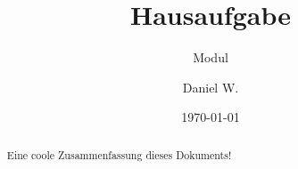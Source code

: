 \documentclass[
    a4paper,
    11pt,
    onecolumn,
    abstracton,
    notitlepage,
    parskip=half,
    egregdoesnotlikesansseriftitles
]{scrartcl} %
\title{Hausaufgabe}
\subtitle{Modul}
\author{Daniel W.}
\date{\today}
\numberwithin{equation}{section}                    %
\theoremstyle{plain} %
\theoremstyle{remark}
\begin{document}
\maketitle

\begin{abstract}
  Eine coole Zusammenfassung dieses Dokuments!
\end{abstract}

\tableofcontents
\listoftodos



\end{document}
